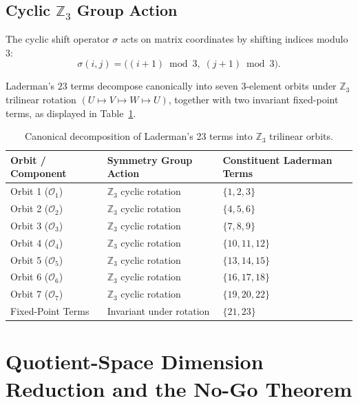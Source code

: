 \documentclass[11pt,reqno]{amsart}
\theoremstyle{plain}
\theoremstyle{definition}
\begin{document}
\subsection{Cyclic $\mathbb{Z}_3$ Group Action}

The cyclic shift operator $\sigma$ acts on matrix coordinates by shifting indices modulo $3$:
\begin{equation}
\sigma(i, j) = \bigl((i + 1) \bmod 3, \; (j + 1) \bmod 3\bigr).
\end{equation}

Laderman's $23$ terms decompose canonically into seven $3$-element orbits under $\mathbb{Z}_3$ trilinear rotation $(U \mapsto V \mapsto W \mapsto U)$, together with two invariant fixed-point terms, as displayed in Table~\ref{tab:laderman-orbits}.

\begin{table}[htbp]
\centering
\caption{Canonical decomposition of Laderman's 23 terms into $\mathbb{Z}_3$ trilinear orbits.}
\label{tab:laderman-orbits}
\vspace{-2mm}
\begin{tabular}{lll}
\toprule
Orbit / Component & Symmetry Group Action & Constituent Laderman Terms \\
\midrule
Orbit 1 ($\mathcal{O}_1$) & $\mathbb{Z}_3$ cyclic rotation & $\{1, 2, 3\}$ \\
Orbit 2 ($\mathcal{O}_2$) & $\mathbb{Z}_3$ cyclic rotation & $\{4, 5, 6\}$ \\
Orbit 3 ($\mathcal{O}_3$) & $\mathbb{Z}_3$ cyclic rotation & $\{7, 8, 9\}$ \\
Orbit 4 ($\mathcal{O}_4$) & $\mathbb{Z}_3$ cyclic rotation & $\{10, 11, 12\}$ \\
Orbit 5 ($\mathcal{O}_5$) & $\mathbb{Z}_3$ cyclic rotation & $\{13, 14, 15\}$ \\
Orbit 6 ($\mathcal{O}_6$) & $\mathbb{Z}_3$ cyclic rotation & $\{16, 17, 18\}$ \\
Orbit 7 ($\mathcal{O}_7$) & $\mathbb{Z}_3$ cyclic rotation & $\{19, 20, 22\}$ \\
Fixed-Point Terms & Invariant under rotation & $\{21, 23\}$ \\
\bottomrule
\end{tabular}
\end{table}

\section{Quotient-Space Dimension Reduction and the No-Go Theorem}
\end{document}
